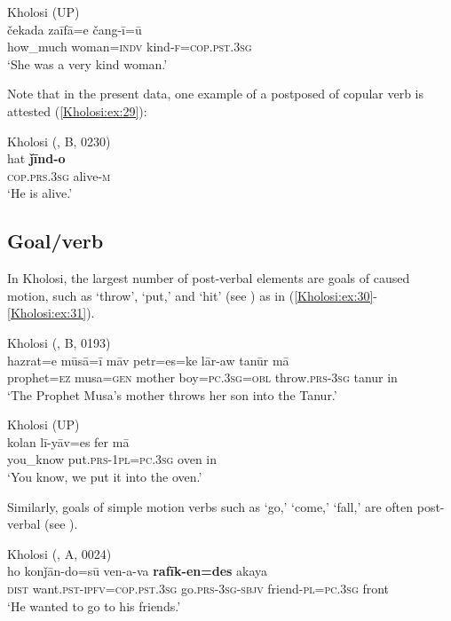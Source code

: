 \documentclass[output=paper,colorlinks,citecolor=brown]{langscibook}
\begin{document}
\ea\label{Kholosi:ex:28}
Kholosi (UP)\\
\gll čekada zaīfā=e čang-ī=ū \\
how{\_}much woman\textsc{=indv} kind\textsc{-f=cop.pst.3sg} \\
\glt `She was a very kind woman.' 
\z

Note that in the present data, one example of a postposed  of copular verb is attested (\ref{Kholosi:ex:29}):

\ea\label{Kholosi:ex:29}
Kholosi (\citealt{nourzaei_kholosi_2022}, B, 0230)\\
\gll hat \textbf{ǰīnd-o} \\
\textsc{cop.prs.3sg} alive\textsc{-m} \\
\glt `He is alive.'
\z

\subsection{Goal/verb}\label{Kholosi:ss:4.3}

In Kholosi, the largest number of post-verbal elements are goals of caused motion, such as `throw', `put,' and `hit' (see ) as in (\ref{Kholosi:ex:30}-\ref{Kholosi:ex:31}).

\ea\label{Kholosi:ex:30}
Kholosi (\citealt{nourzaei_kholosi_2022}, B, 0193)\\
\gll hazrat=e mūsā=ī māv petr=es=ke lār-aw tanūr mā \\
prophet\textsc{=ez} musa\textsc{=gen} mother boy\textsc{=pc.3sg=obl} throw\textsc{.prs-3sg} tanur in \\
\glt `The Prophet Musa's mother throws her son into the Tanur.' 
\z

\ea\label{Kholosi:ex:31}
Kholosi (UP)\\
\gll kolan lī-yāv=es fer mā \\
you\_know put\textsc{.prs-1pl=pc.3sg} oven in \\
\glt `You know, we put it into the oven.' 
\z

Similarly, goals of simple motion verbs such as `go,' `come,' `fall,' are often post-verbal (see ).

\ea\label{Kholosi:ex:32}
Kholosi (\citealt{nourzaei_kholosi_2022}, A, 0024)\\
\gll ho konǰān-do=sū ven-a-va \textbf{rafīk-en=des} akaya\\
\textsc{dist} want\textsc{.pst-ipfv=cop.pst.3sg} go\textsc{.prs-3sg-sbjv} friend\textsc{-pl=pc.3sg} front\\
\glt `He wanted to go to his friends.' 
\z
\end{document}
